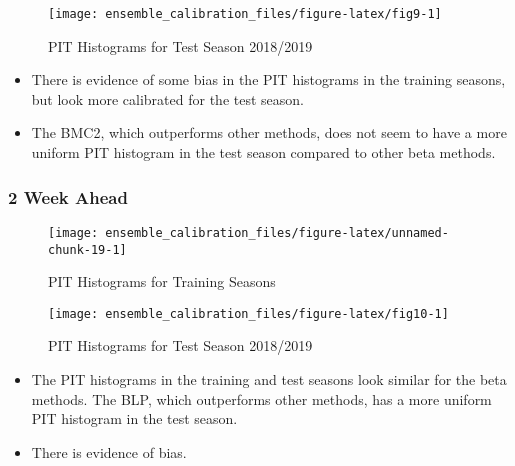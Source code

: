 \documentclass[
]{article}
\begin{document}
\newpage

\begin{figure}[H]

{\centering \texttt{[image: ensemble\_calibration\_files/figure-latex/fig9-1]} 

}

\caption{PIT Histograms for Test Season 2018/2019}\label{fig:fig9}
\end{figure}

\begin{itemize}
\item There is evidence of some bias in the PIT histograms in the training seasons, but look more calibrated for the test season.
\item The BMC2, which outperforms other methods, does not seem to have a more uniform PIT histogram in the test season compared to other beta methods.
\end{itemize}

\newpage

\hypertarget{week-ahead-9}{%
\subsubsection{2 Week Ahead}\label{week-ahead-9}}

\begin{figure}[H]

{\centering \texttt{[image: ensemble\_calibration\_files/figure-latex/unnamed-chunk-19-1]} 

}

\caption{PIT Histograms for Training Seasons}\label{fig:unnamed-chunk-19}
\end{figure}

\newpage

\begin{figure}[H]

{\centering \texttt{[image: ensemble\_calibration\_files/figure-latex/fig10-1]} 

}

\caption{PIT Histograms for Test Season 2018/2019}\label{fig:fig10}
\end{figure}

\begin{itemize}
\item The PIT histograms in the training and test seasons look similar for the beta methods. The BLP, which outperforms other methods, has a more uniform PIT histogram in the test season.
\item There is evidence of bias.
\end{itemize}
\end{document}
